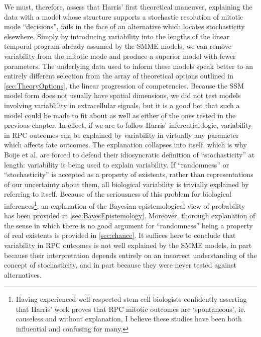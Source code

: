 We must, therefore, assess that Harris' first theoretical maneuver, explaining the data with a model whose structure supports a stochastic resolution of mitotic mode ``decisions'', fails in the face of an alternative which locates stochasticity elsewhere. Simply by introducing variability into the lengths of the linear temporal program already assumed by the SMME models, we can remove variability from the mitotic mode and produce a superior model with fewer parameters. The underlying data used to inform these models speak better to an entirely different selection from the array of theoretical options outlined in \autoref{sec:TheoryOptions}, the linear progression of competencies. Because the SSM model form does not usually have spatial dimensions, we did not test models involving variablility in extracellular signals, but it is a good bet that such a model could be made to fit about as well as either of the ones tested in the previous chapter. In effect, if we are to follow Harris' inferential logic, variability in RPC outcomes can be explained by variability in virtually any parameter which affects fate outcomes. The explanation collapses into itself, which is why Boije et al. \cite{Boije2015} are forced to defend their idiosyncratic definition of ``stochasticity'' at length: variability is being used to explain variability. If ``randomness'' or ``stochasticity'' is accepted as a property of existents, rather than representations of our uncertainty about them, all biological variability is trivially explained by referring to itself. Because of the seriousness of this problem for biological inferences\footnote{Having experienced well-respected stem cell biologists confidently asserting that Harris' work proves that RPC mitotic outcomes are `spontaneous', ie. causeless and without explanation, I believe these studies have been both influential and confusing for many.}, an explanation of the Bayesian epistemological view of probability has been provided in \autoref{sec:BayesEpistemology}. Moreover, thorough explanation of the sense in which there is no good argument for ``randomness'' being a property of real existents is provided in \autoref{sec:chance}. It suffices here to conclude that variability in RPC outcomes is not well explained by the SMME models, in part because their interpretation depends entirely on an incorrect understanding of the concept of stochasticity, and in part because they were never tested against alternatives.

